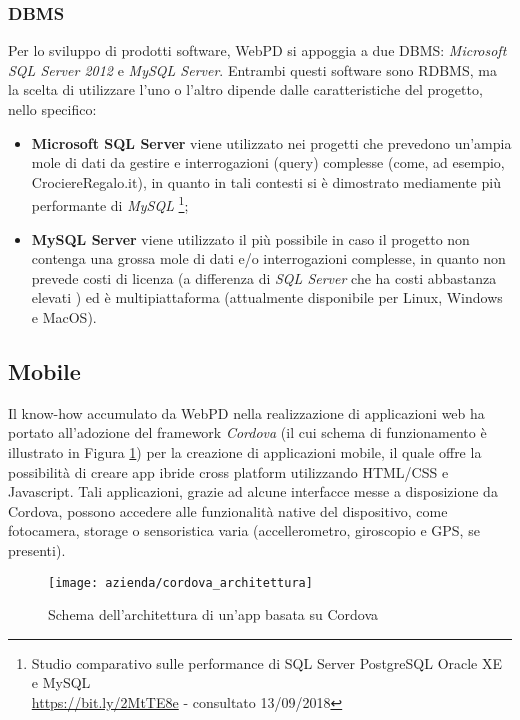 \subsubsection{DBMS}
Per lo sviluppo di prodotti software, WebPD si appoggia a due \gls{DBMS}: \textit{Microsoft SQL Server 2012} e \textit{MySQL Server}. Entrambi questi software sono \gls{RDBMS}, ma la scelta di utilizzare l'uno o l'altro dipende dalle caratteristiche del progetto, nello specifico: 
\begin{itemize}
	\item \textbf{Microsoft SQL Server} viene utilizzato nei progetti che prevedono un'ampia mole di dati da gestire e interrogazioni (query) complesse (come, ad esempio, CrociereRegalo.it), in quanto in tali contesti si è dimostrato mediamente più performante di \textit{MySQL}
	\footnote{Studio comparativo sulle performance di SQL Server PostgreSQL Oracle XE e MySQL\\\url{https://bit.ly/2MtTE8e} - consultato 13/09/2018};
	\item \textbf{MySQL Server} viene utilizzato il più possibile in caso il progetto non contenga una grossa mole di dati e/o interrogazioni complesse, in quanto non prevede costi di licenza (a differenza di \textit{SQL Server} che ha costi abbastanza elevati \cite{sqlserverpricing}) ed è multipiattaforma (attualmente disponibile per Linux, Windows e MacOS).
\end{itemize}

\subsection{Mobile}
Il know-how accumulato da WebPD nella realizzazione di applicazioni web ha portato all'adozione del framework \textit{Cordova} (il cui schema di funzionamento è illustrato in Figura \ref{figura:funzionamento-cordova}) per la creazione di applicazioni mobile, il quale offre la possibilità di creare app ibride cross platform utilizzando HTML/CSS e Javascript. Tali applicazioni, grazie ad alcune interfacce messe a disposizione da Cordova, possono accedere alle funzionalità native del dispositivo, come fotocamera, storage o sensoristica varia (accellerometro, giroscopio e GPS, se presenti).

\begin{figure}[!h] 
	\centering 
	\texttt{[image: azienda/cordova\_architettura]} 
	\caption{Schema dell'architettura di un'app basata su Cordova}
	\label{figura:funzionamento-cordova}
\end{figure}

